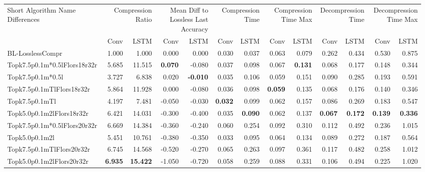 \begin{tabular}{lrrrrrrrrrrrr}
\toprule
\multicolumn{1}{p{2.5cm}}{Short Algorithm Name Differences} & \multicolumn{2}{p{1.8cm}}{Compression Ratio} & \multicolumn{2}{p{1.8cm}}{Mean Diff to Lossless Last Accuracy} & \multicolumn{2}{p{1.8cm}}{Compression Time} & \multicolumn{2}{p{1.8cm}}{Compression Time Max} & \multicolumn{2}{p{1.8cm}}{Decompression Time} & \multicolumn{2}{p{1.8cm}}{Decompression Time Max} \\
 & Conv & LSTM & Conv & LSTM & Conv & LSTM & Conv & LSTM & Conv & LSTM & Conv & LSTM \\
\midrule
BL-LosslessCompr & 1.000 & 1.000 & 0.000 & 0.000 & 0.030 & 0.037 & 0.063 & 0.079 & 0.262 & 0.434 & 0.530 & 0.875 \\
Topk7.5p0.1m*0.5lFlors18r32r & 5.685 & 11.515 & \bfseries 0.070 & -0.080 & 0.037 & 0.098 & 0.067 & \bfseries 0.131 & 0.068 & 0.177 & 0.148 & 0.344 \\
Topk7.5p0.1m*0.5l & 3.727 & 6.838 & 0.020 & \bfseries -0.010 & 0.035 & 0.106 & 0.059 & 0.151 & 0.090 & 0.285 & 0.193 & 0.591 \\
Topk7.5p0.1mTlFlors18r32r & 5.864 & 11.928 & 0.000 & -0.080 & 0.036 & 0.098 & \bfseries 0.059 & 0.135 & 0.068 & 0.176 & 0.140 & 0.346 \\
Topk7.5p0.1mTl & 4.197 & 7.481 & -0.050 & -0.030 & \bfseries 0.032 & 0.099 & 0.062 & 0.157 & 0.086 & 0.269 & 0.183 & 0.547 \\
Topk5.0p0.1m2lFlors18r32r & 6.421 & 14.031 & -0.300 & -0.400 & 0.035 & \bfseries 0.090 & 0.062 & 0.137 & \bfseries 0.067 & \bfseries 0.172 & \bfseries 0.139 & \bfseries 0.336 \\
Topk7.5p0.1m*0.5lFlors20r32r & 6.669 & 14.384 & -0.360 & -0.240 & 0.060 & 0.254 & 0.092 & 0.310 & 0.112 & 0.492 & 0.236 & 1.015 \\
Topk5.0p0.1m2l & 5.451 & 10.761 & -0.380 & -0.350 & 0.033 & 0.095 & 0.064 & 0.134 & 0.089 & 0.272 & 0.187 & 0.564 \\
Topk7.5p0.1mTlFlors20r32r & 6.745 & 14.568 & -0.520 & -0.270 & 0.065 & 0.263 & 0.097 & 0.361 & 0.117 & 0.482 & 0.258 & 1.012 \\
Topk5.0p0.1m2lFlors20r32r & \bfseries 6.935 & \bfseries 15.422 & -1.050 & -0.720 & 0.058 & 0.259 & 0.088 & 0.331 & 0.106 & 0.494 & 0.225 & 1.020 \\
\bottomrule
\end{tabular}
